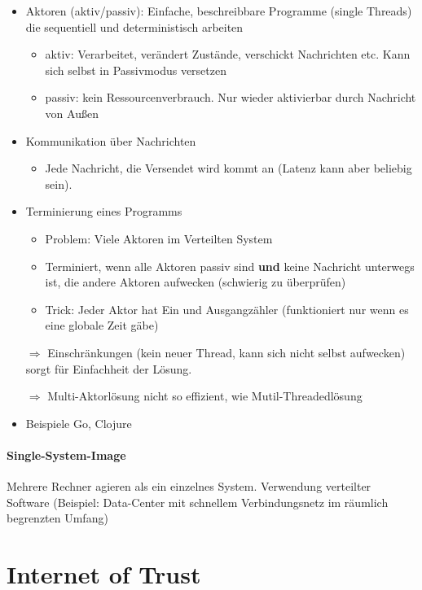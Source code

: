 \documentclass{scrartcl}
\begin{document}
\begin{itemize}
\item Aktoren (aktiv/passiv): Einfache, beschreibbare Programme (single Threads) die sequentiell und deterministisch arbeiten
\begin{itemize}
\item aktiv: Verarbeitet, verändert Zustände, verschickt Nachrichten etc. Kann sich selbst in Passivmodus versetzen
\item passiv: kein Ressourcenverbrauch. Nur wieder aktivierbar durch Nachricht von Außen
\end{itemize}
\item Kommunikation über Nachrichten
\begin{itemize}
\item Jede Nachricht, die Versendet wird kommt an (Latenz kann aber beliebig sein). 
\end{itemize}
\item Terminierung eines Programms
\begin{itemize}
\item Problem: Viele Aktoren im Verteilten System
\item Terminiert, wenn alle Aktoren passiv sind \textbf{und} keine Nachricht unterwegs ist, die andere Aktoren aufwecken (schwierig zu überprüfen)
\item Trick: Jeder Aktor hat Ein und Ausgangzähler (funktioniert nur wenn es eine globale Zeit gäbe)
\end{itemize}
\item[$\Rightarrow$] Einschränkungen (kein neuer Thread, kann sich nicht selbst aufwecken) sorgt für Einfachheit der Lösung.
\item[$\Rightarrow$] Multi-Aktorlösung nicht so effizient, wie Mutil-Threadedlösung
\item Beispiele Go, Clojure
\end{itemize}
\paragraph{Single-System-Image} \label{ssi} Mehrere Rechner agieren als ein einzelnes System. Verwendung verteilter Software (Beispiel: Data-Center mit schnellem Verbindungsnetz im räumlich begrenzten Umfang)


%
%



\newpage
\section{Internet of Trust} \label{cap}
\end{document}
